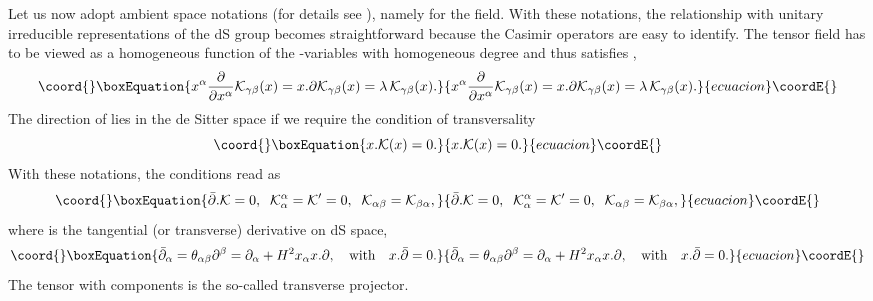 \documentclass[a4paper,11pt,showpacs,preprintnumbers]{revtex4}
\def\setR{\mathbb{R}}
\begin{document}
Let us now adopt ambient space notations (for details see
\cite{fr}), namely \coordHE{} for the field. With
these notations, the relationship with unitary irreducible
representations of the dS group becomes straightforward  because
the Casimir operators are easy to identify. The tensor field
\coordHE{} has to be viewed as a homogeneous
function of the \myHighlight{$\setR^5$}\coordHE{}-variables \coordHE{} with homogeneous
degree \myHighlight{$\lambda$}\coordHE{} and thus satisfies ,
\begin{equation}\coord{}\boxEquation{
x^{\alpha}\frac{\partial }{\partial x^{\alpha}}{\cal
K}_{\gamma\beta}(x)= x.\partial {\cal
K}_{\gamma\beta}(x)=\lambda\, {\cal K}_{\gamma\beta}(x).
}{
x^{\alpha}\frac{\partial }{\partial x^{\alpha}}{\cal
K}_{\gamma\beta}(x)= x.\partial {\cal
K}_{\gamma\beta}(x)=\lambda\, {\cal K}_{\gamma\beta}(x).
}{ecuacion}\coordE{}\end{equation}
The direction of \coordHE{}  lies in the de
Sitter space if we require the condition of transversality
\cite{di}
\begin{equation}\coord{}\boxEquation{
x.{\cal K}(x)=0. \label{eq:tra}
}{
x.{\cal K}(x)=0. }{ecuacion}\coordE{}\end{equation}
With these notations, the conditions \myHighlight{$(\ref{eq:con1})$}\coordHE{} read as
\begin{equation}\coord{}\boxEquation{
\bar \partial. {\cal K}=0,\;\; {\cal K}_{\alpha}^{\alpha}={\cal
K}'=0,\;\; {\cal K}_{\alpha\beta}={\cal K}_{\beta\alpha},
\label{eq:con2}
}{
\bar \partial. {\cal K}=0,\;\; {\cal K}_{\alpha}^{\alpha}={\cal
K}'=0,\;\; {\cal K}_{\alpha\beta}={\cal K}_{\beta\alpha},
}{ecuacion}\coordE{}\end{equation}
where \myHighlight{$\bar\partial$}\coordHE{} is the tangential (or transverse) derivative
on dS space,
\begin{equation}\coord{}\boxEquation{
\bar\partial_\alpha=\theta_{\alpha\beta}\partial^\beta=\partial_\alpha
+H^2x_\alpha x.\partial,\quad\mbox{with}\quad x.\bar\partial=0.
}{
\bar\partial_\alpha=\theta_{\alpha\beta}\partial^\beta=\partial_\alpha
+H^2x_\alpha x.\partial,\quad\mbox{with}\quad x.\bar\partial=0.
}{ecuacion}\coordE{}\end{equation}
The tensor with components
\coordHE{}
is the so-called transverse projector.
\end{document}
